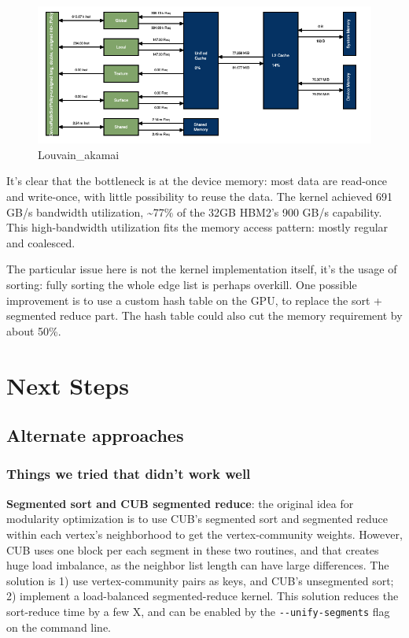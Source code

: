 \documentclass[10pt,oneside]{memoir}
\begin{document}
\begin{figure}
\centering
\includegraphics{attachments/louvain/Louvain_akamai.png}
\caption{Louvain\_akamai}
\end{figure}

It's clear that the bottleneck is at the device memory: most data are
read-once and write-once, with little possibility to reuse the data. The
kernel achieved 691 GB/s bandwidth utilization, \textasciitilde{}77\% of
the 32GB HBM2's 900 GB/s capability. This high-bandwidth utilization
fits the memory access pattern: mostly regular and coalesced.

The particular issue here is not the kernel implementation itself, it's
the usage of sorting: fully sorting the whole edge list is perhaps
overkill. One possible improvement is to use a custom hash table on the
GPU, to replace the sort + segmented reduce part. The hash table could
also cut the memory requirement by about 50\%.

\hypertarget{next-steps-4}{%
\section{Next Steps}\label{next-steps-4}}

\hypertarget{alternate-approaches-3}{%
\subsection{Alternate approaches}\label{alternate-approaches-3}}

\hypertarget{things-we-tried-that-didnt-work-well}{%
\subsubsection{Things we tried that didn't work
well}\label{things-we-tried-that-didnt-work-well}}

\textbf{Segmented sort and CUB segmented reduce}: the original idea for
modularity optimization is to use CUB's segmented sort and segmented
reduce within each vertex's neighborhood to get the vertex-community
weights. However, CUB uses one block per each segment in these two
routines, and that creates huge load imbalance, as the neighbor list
length can have large differences. The solution is 1) use
vertex-community pairs as keys, and CUB's unsegmented sort; 2) implement
a load-balanced segmented-reduce kernel. This solution reduces the
sort-reduce time by a few X, and can be enabled by the
\texttt{-\/-unify-segments} flag on the command line.
\end{document}
